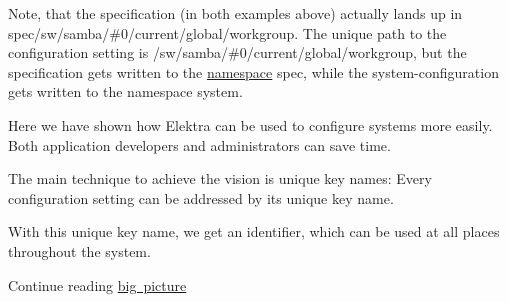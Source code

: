 \begin{DoxyCode}{0}
\DoxyCodeLine{\}}
\end{DoxyCode}


Note, that the specification (in both examples above) actually lands up in {\ttfamily spec/sw/samba/\#0/current/global/workgroup}. The unique path to the configuration setting is {\ttfamily /sw/samba/\#0/current/global/workgroup}, but the specification gets written to the \mbox{\hyperlink{doc_tutorials_namespaces_md}{namespace}} {\ttfamily spec}, while the system-\/configuration gets written to the namespace {\ttfamily system}.

Here we have shown how Elektra can be used to configure systems more easily. Both application developers and administrators can save time.

The main technique to achieve the vision is unique key names\+: Every configuration setting can be addressed by its unique key name.

With this unique key name, we get an identifier, which can be used at all places throughout the system.


\begin{DoxyItemize}
\item Continue reading \mbox{\hyperlink{doc_BIGPICTURE_md}{big picture}} 
\end{DoxyItemize}